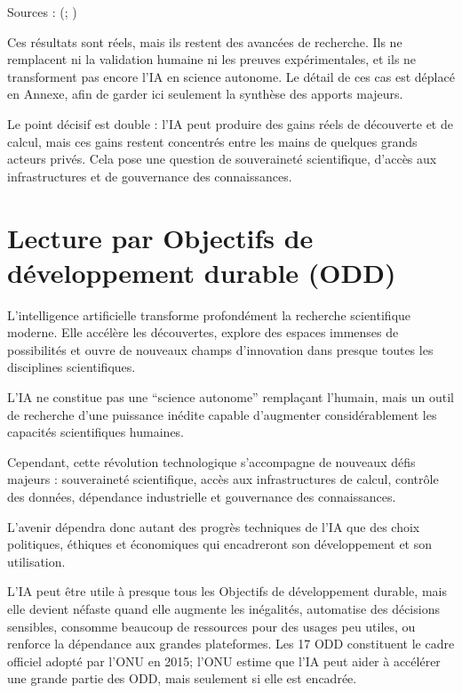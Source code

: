 \documentclass[
  10pt,
  a4paper,
  DIV=11,
  numbers=noendperiod,
  oneside]{scrreprt}
\begin{document}
Sources : (;
)

Ces résultats sont réels, mais ils restent des avancées de recherche.
Ils ne remplacent ni la validation humaine ni les preuves
expérimentales, et ils ne transforment pas encore l'IA en science
autonome. Le détail de ces cas est déplacé en Annexe, afin de garder ici
seulement la synthèse des apports majeurs.

Le point décisif est double : l'IA peut produire des gains réels de
découverte et de calcul, mais ces gains restent concentrés entre les
mains de quelques grands acteurs privés. Cela pose une question de
souveraineté scientifique, d'accès aux infrastructures et de gouvernance
des connaissances.

\section{Lecture par Objectifs de développement durable
(ODD)}\label{lecture-par-objectifs-de-duxe9veloppement-durable-odd}

L'intelligence artificielle transforme profondément la recherche
scientifique moderne. Elle accélère les découvertes, explore des espaces
immenses de possibilités et ouvre de nouveaux champs d'innovation dans
presque toutes les disciplines scientifiques.

L'IA ne constitue pas une ``science autonome'' remplaçant l'humain, mais
un outil de recherche d'une puissance inédite capable d'augmenter
considérablement les capacités scientifiques humaines.

Cependant, cette révolution technologique s'accompagne de nouveaux défis
majeurs : souveraineté scientifique, accès aux infrastructures de
calcul, contrôle des données, dépendance industrielle et gouvernance des
connaissances.

L'avenir dépendra donc autant des progrès techniques de l'IA que des
choix politiques, éthiques et économiques qui encadreront son
développement et son utilisation.

L'IA peut être utile à presque tous les Objectifs de développement
durable, mais elle devient néfaste quand elle augmente les inégalités,
automatise des décisions sensibles, consomme beaucoup de ressources pour
des usages peu utiles, ou renforce la dépendance aux grandes
plateformes. Les 17 ODD constituent le cadre officiel adopté par l'ONU
en 2015; l'ONU estime que l'IA peut aider à accélérer une grande partie
des ODD, mais seulement si elle est encadrée.
\end{document}
